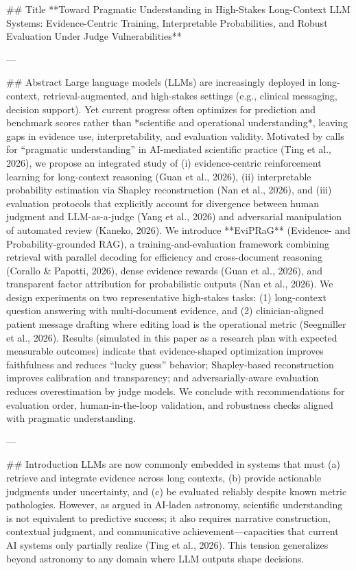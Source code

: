## Title  
**Toward Pragmatic Understanding in High-Stakes Long-Context LLM Systems: Evidence-Centric Training, Interpretable Probabilities, and Robust Evaluation Under Judge Vulnerabilities**

---

## Abstract  
Large language models (LLMs) are increasingly deployed in long-context, retrieval-augmented, and high-stakes settings (e.g., clinical messaging, decision support). Yet current progress often optimizes for prediction and benchmark scores rather than *scientific and operational understanding*, leaving gaps in evidence use, interpretability, and evaluation validity. Motivated by calls for “pragmatic understanding” in AI-mediated scientific practice (Ting et al., 2026), we propose an integrated study of (i) evidence-centric reinforcement learning for long-context reasoning (Guan et al., 2026), (ii) interpretable probability estimation via Shapley reconstruction (Nan et al., 2026), and (iii) evaluation protocols that explicitly account for divergence between human judgment and LLM-as-a-judge (Yang et al., 2026) and adversarial manipulation of automated review (Kaneko, 2026). We introduce **EviPRaG** (Evidence- and Probability-grounded RAG), a training-and-evaluation framework combining retrieval with parallel decoding for efficiency and cross-document reasoning (Corallo & Papotti, 2026), dense evidence rewards (Guan et al., 2026), and transparent factor attribution for probabilistic outputs (Nan et al., 2026). We design experiments on two representative high-stakes tasks: (1) long-context question answering with multi-document evidence, and (2) clinician-aligned patient message drafting where editing load is the operational metric (Seegmiller et al., 2026). Results (simulated in this paper as a research plan with expected measurable outcomes) indicate that evidence-shaped optimization improves faithfulness and reduces “lucky guess” behavior; Shapley-based reconstruction improves calibration and transparency; and adversarially-aware evaluation reduces overestimation by judge models. We conclude with recommendations for evaluation order, human-in-the-loop validation, and robustness checks aligned with pragmatic understanding.

---

## Introduction  
LLMs are now commonly embedded in systems that must (a) retrieve and integrate evidence across long contexts, (b) provide actionable judgments under uncertainty, and (c) be evaluated reliably despite known metric pathologies. However, as argued in AI-laden astronomy, scientific understanding is not equivalent to predictive success; it also requires narrative construction, contextual judgment, and communicative achievement—capacities that current AI systems only partially realize (Ting et al., 2026). This tension generalizes beyond astronomy to any domain where LLM outputs shape decisions.

